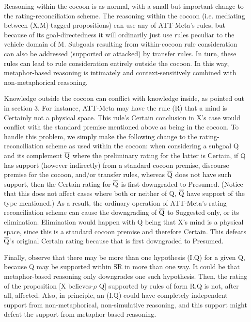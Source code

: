 Reasoning within the cocoon is as normal, with a small but important change to
the rating-reconciliation scheme. The reasoning within the cocoon (i.e.
mediating between (X,M)-tagged propositions) can use any of ATT-Meta's rules,
but because of its goal-directedness it will ordinarily just use rules peculiar
to the vehicle domain of M. Subgoals resulting from within-cocoon rule
consideration can also be addressed (supported or attacked) by transfer rules.
In turn, these rules can lead to rule consideration entirely outside the
cocoon. In this way, metaphor-based reasoning is intimately and
context-sensitively combined with non-metaphorical reasoning.

Knowledge outside the cocoon can conflict with knowledge inside, as pointed out
in section 3. For instance, ATT-Meta may have the rule (R) that a mind is
Certainly not a physical space. This rule's Certain conclusion in X's case
would conflict with the standard premise mentioned above as being in the
cocoon.  To handle this problem, we simply make the following change to the
rating-reconciliation scheme as used within the cocoon: when considering a
subgoal Q and its complement $\overline{{\rm Q}}$ where the preliminary rating
for the latter is Certain, if Q has support (however indirectly) from a
standard cocoon premise, discourse premise for the cocoon, and/or transfer
rules, whereas $\overline{{\rm Q}}$ does not have such support, then the
Certain rating for $\overline{{\rm Q}}$ is first downgraded to Presumed.
(Notice that this does not affect cases where both or neither of Q,
$\overline{{\rm Q}}$ have support of the type mentioned.)  As a result, the
ordinary operation of ATT-Meta's rating reconciliation scheme can cause the
downgrading of $\overline{{\rm Q}}$ to Suggested only, or its elimination.
Elimination would happen with Q being that X's mind is a physical space, since
this is a standard cocoon premise and therefore Certain. This defeats
$\overline{{\rm Q}}$'s original Certain rating because that is first downgraded
to Presumed.

Finally, observe that there may be more than one hypothesis (I.Q) for a given
Q, because Q may be supported within SR in more than one way.  It could be that
metaphor-based reasoning only downgrades one such hypothesis.  Then, the rating
of the proposition [X believes-$\rho$ Q] supported by rules of form R.Q is not,
after all, affected. Also, in principle, an (I.Q) could have completely
independent support from non-metaphorical, non-simulative reasoning, and this
support might defeat the support from metaphor-based reasoning.





